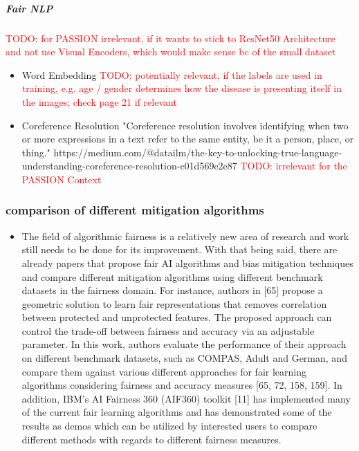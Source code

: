 \documentclass[12pt, a4paper, oneside]{book}   	%
\renewcommand{\todo}[1]{\textcolor{red}{TODO: #1}}
\renewcommand{\paragraph}[1]{%
	\subsubsection*{#1}%
}
\begin{document}
			\subparagraph{Fair NLP}
				\todo{for PASSION irrelevant, if it wants to stick to ResNet50 Architecture \autocite{Gottfrois2024} and not use Visual Encoders, which would make sense bc of the small dataset}
				\begin{itemize}
					\item Word Embedding \todo{potentially relevant, if the labels are used in training, e.g. age / gender determines how the disease is presenting itself in the images; check \autocite{Mehrabi_2021} page 21 if relevant}
					\item Coreference Resolution "Coreference resolution involves identifying when two or more expressions in a text refer to the same entity, be it a person, place, or thing." https://medium.com/@datailm/the-key-to-unlocking-true-language-understanding-coreference-resolution-c01d569e2e87 \todo{irrelevant for the PASSION Context}
				\end{itemize}
				
			\paragraph{comparison of different mitigation algorithms}
				\begin{itemize}
					\item The field of algorithmic fairness is a relatively new area of research and work still needs to be done for its improvement. With that being said, there are already papers that propose fair AI algorithms and bias mitigation techniques and compare different mitigation algorithms using different benchmark datasets in the fairness domain. For instance, authors in [65] propose a geometric solution to learn fair representations that removes correlation between protected and unprotected features. The proposed approach can control the trade-off between fairness and accuracy via an adjustable parameter. In this work, authors evaluate the performance of their approach on different benchmark datasets, such as COMPAS, Adult and German, and compare them against various different approaches for fair learning algorithms considering fairness and accuracy measures [65, 72, 158, 159]. In addition, IBM’s AI Fairness 360 (AIF360) toolkit [11] has implemented many of the current fair learning algorithms and has demonstrated some of the results as demos which can be utilized by interested users to compare different methods with regards to different fairness measures. \autocite{Mehrabi_2021}
				\end{itemize}			
			
\end{document}
